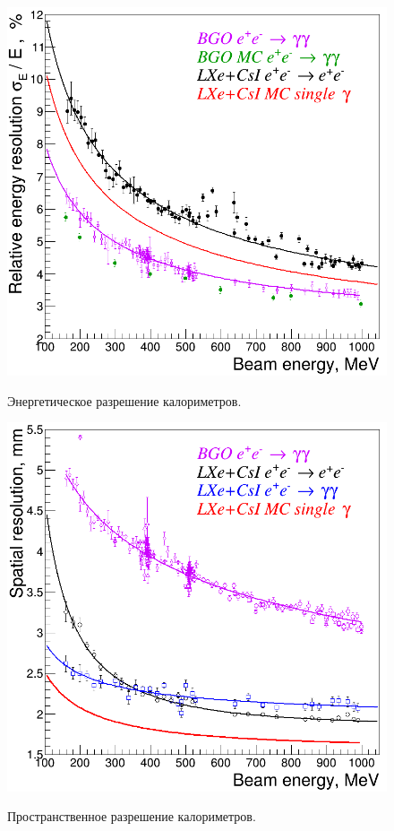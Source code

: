 \begin{figure}[htbp]
    \begin{minipage}[t]{0.475\textwidth}
        \centering
        \includegraphics[width=\textwidth]{img/cmd3_detector/comb_energy_resolution.png}
        \label{fig:cal_energy_resolution}
        \caption{Энергетическое разрешение калориметров.}
    \end{minipage}
    \hfill
    \begin{minipage}[t]{0.475\textwidth}
        \centering
        \includegraphics[width=\textwidth]{img/cmd3_detector/comb_spatial_resolution.png}
        \label{fig:cal_spatial_resolution}
        \caption{Пространственное разрешение калориметров.}
  \end{minipage}
\end{figure}



